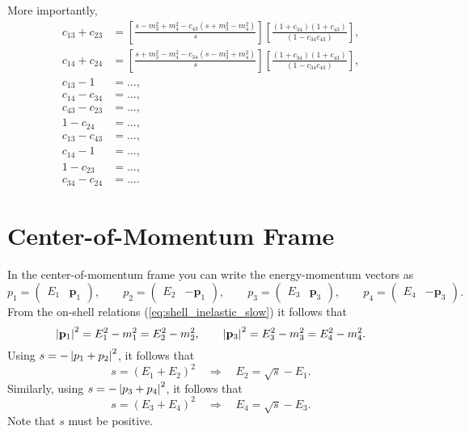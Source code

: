 More importantly,
\begin{align}
	c_{13} + c_{23} &= \left[ \frac{s - m_{3}^{2} + m_{4}^{2} - c_{43} \left( s + m_{3}^{2} - m_{4}^{2} \right)}{s} \right] \left[ \frac{\left(1 + c_{34} \right) \left(1 + c_{43} \right)}{\left(1 - c_{34} c_{43} \right)} \right], \\
	c_{14} + c_{24} &= \left[ \frac{s + m_{3}^{2} - m_{4}^{2} - c_{34} \left( s - m_{3}^{2} + m_{4}^{2} \right)}{s} \right] \left[ \frac{\left(1 + c_{34} \right) \left(1 + c_{43} \right)}{\left(1 - c_{34} c_{43} \right)} \right], \\
	c_{13} - 1 &= ..., \\
	c_{14} - c_{34} &= ..., \\
	c_{43} - c_{23} &= ..., \\
	1 - c_{24} &= ..., \\
	c_{13} - c_{43} &= ..., \\
	c_{14} - 1 &= ..., \\
	1 - c_{23} &= ..., \\
	c_{34} - c_{24} &= ....
\end{align}
\section{Center-of-Momentum Frame}
In the center-of-momentum frame you can write the energy-momentum vectors as
\begin{equation}
	p_{1} = \begin{pmatrix} E_{1} & \mathbf{p}_{1} \end{pmatrix}, \qquad p_{2} = \begin{pmatrix} E_{2} & -\mathbf{p}_{1} \end{pmatrix}, \qquad p_{3} = \begin{pmatrix} E_{3} & \mathbf{p}_{3} \end{pmatrix}, \qquad p_{4} = \begin{pmatrix} E_{4} & -\mathbf{p}_{3} \end{pmatrix}.
\end{equation}
From the on-shell relations (\ref{eq:shell_inelastic_slow}) it follows that
\begin{equation}
	\left\lvert \mathbf{p}_{1} \right\rvert^{2} = E_{1}^{2} - m_{1}^{2} = E_{2}^{2} - m_{2}^{2}, \qquad \left\lvert \mathbf{p}_{3} \right\rvert^{2} = E_{3}^{2} - m_{3}^{2} = E_{4}^{2} - m_{4}^{2}.
\end{equation}
Using $s = -\left\lvert p_{1} + p_{2} \right\rvert^{2}$, it follows that
\begin{equation}
	s = \left( E_{1} + E_{2} \right)^{2} \quad \Longrightarrow \quad E_{2} = \sqrt{s} - E_{1}.
\end{equation}
Similarly, using $s = -\left\lvert p_{3} + p_{4} \right\rvert^{2}$, it follows that
\begin{equation}
	s = \left( E_{3} + E_{4} \right)^{2} \quad \Longrightarrow \quad E_{4} = \sqrt{s} - E_{3}.
\end{equation}
Note that $s$ must be positive.

